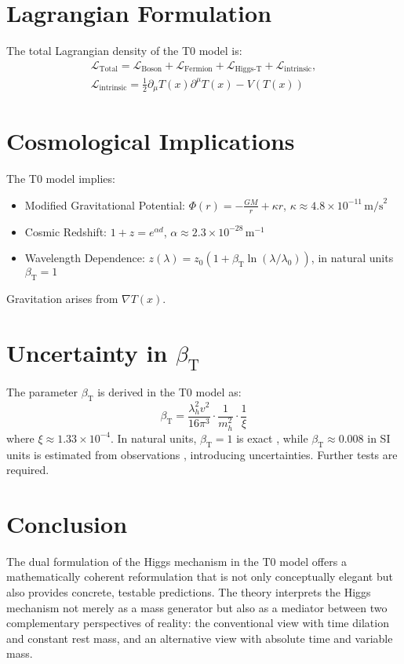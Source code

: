 \documentclass[a4paper,12pt]{article}
\newcommand{\Tfield}{T(x)}
\newcommand{\betaT}{\beta_{\text{T}}}
\begin{document}
	\section{Lagrangian Formulation}
	The total Lagrangian density of the T0 model is:
	\begin{multline}
		\mathcal{L}_{\text{Total}} = \mathcal{L}_{\text{Boson}} + \mathcal{L}_{\text{Fermion}} + \mathcal{L}_{\text{Higgs-T}} + \mathcal{L}_{\text{intrinsic}}, \\
		\mathcal{L}_{\text{intrinsic}} = \frac{1}{2} \partial_\mu \Tfield \partial^\mu \Tfield - V(\Tfield)
	\end{multline}
	
	\section{Cosmological Implications}
	The T0 model implies:
	\begin{itemize}
		\item Modified Gravitational Potential: \( \Phi(r) = -\frac{GM}{r} + \kappa r \), \( \kappa \approx 4.8 \times 10^{-11} \, \text{m/s}^2 \)
		\item Cosmic Redshift: \( 1 + z = e^{\alpha d} \), \( \alpha \approx 2.3 \times 10^{-28} \, \text{m}^{-1} \)
		\item Wavelength Dependence: \( z(\lambda) = z_0 (1 + \betaT \ln(\lambda/\lambda_0)) \), in natural units \(\betaT = 1\)
	\end{itemize}
	Gravitation arises from \( \nabla \Tfield \).
	
	\section{Uncertainty in \(\betaT\)}
	The parameter \(\betaT\) is derived in the T0 model as:
	\begin{equation}
		\betaT = \frac{\lambda_h^2 v^2}{16\pi^3} \cdot \frac{1}{m_h^2} \cdot \frac{1}{\xi}
	\end{equation}
	where \(\xi \approx 1.33 \times 10^{-4}\). In natural units, \(\betaT = 1\) is exact \cite{pascher_alphabeta_2025}, while \(\betaT \approx 0.008\) in SI units is estimated from observations \cite{pascher_massenvariation_2025}, introducing uncertainties. Further tests are required.
	
	\section{Conclusion}
	The dual formulation of the Higgs mechanism in the T0 model offers a mathematically coherent reformulation that is not only conceptually elegant but also provides concrete, testable predictions. The theory interprets the Higgs mechanism not merely as a mass generator but also as a mediator between two complementary perspectives of reality: the conventional view with time dilation and constant rest mass, and an alternative view with absolute time and variable mass.
	
\end{document}
